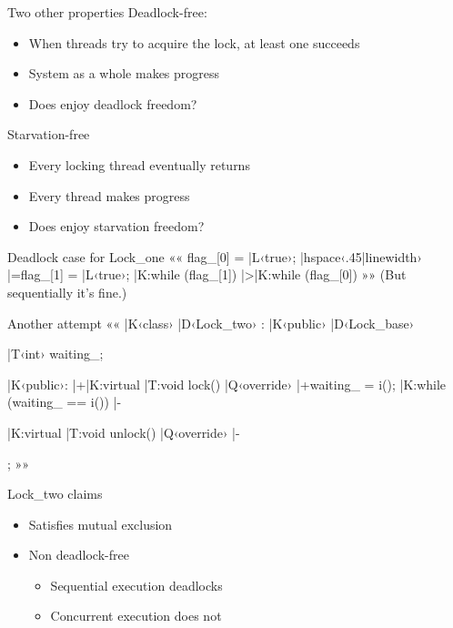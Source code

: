 \documentclass{beamer}
\begin{document}
\begin{frame}{Two other properties}{}
  Deadlock-free:
  \begin{itemize}
    \item When threads try to acquire the lock, at least one succeeds
    \item System as a whole makes progress
    \item<2> Does  enjoy deadlock freedom?
  \end{itemize}
   Starvation-free
  \begin{itemize}
    \item Every locking thread eventually returns
    \item Every thread makes progress
    \item<2> Does  enjoy starvation freedom?
  \end{itemize}
\end{frame}

\begin{frame}[fragile]{Deadlock case for Lock\_one}{}
  ««
  flag_[0] = |L‹true›;
  |hspace‹.45|linewidth› |=flag_[1] = |L‹true›;
  |K:while (flag_[1]) {}
                         |>|K:while (flag_[0]) {}
  »»
  \bigskip
(But sequentially it's fine.)
\end{frame}

\begin{frame}[fragile]{Another attempt}{}
  ««
  |K‹class› |D‹Lock_two› : |K‹public› |D‹Lock_base›
  {
  	|T‹int› waiting_;

  |K‹public›:
  	|+|K:virtual |T:void lock() |Q‹override›
    {
    	|+waiting_ = i();
      |K:while (waiting_ == i()) {} |-
    }

    |K:virtual |T:void unlock() |Q‹override› {} |-
  };
  »»
\end{frame}

\begin{frame}{Lock\_two claims}{}
  \begin{itemize}
    \item Satisfies mutual exclusion
    \item Non deadlock-free
      \begin{itemize}
        \item Sequential execution deadlocks
        \item Concurrent execution does not
      \end{itemize}
  \end{itemize}
\end{frame}
\end{document}
